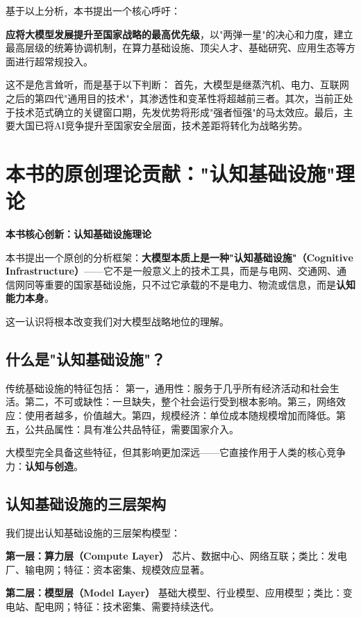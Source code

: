 基于以上分析，本书提出一个核心呼吁：

\textbf{应将大模型发展提升至国家战略的最高优先级}，以"两弹一星"的决心和力度，建立最高层级的统筹协调机制，在算力基础设施、顶尖人才、基础研究、应用生态等方面进行超常规投入。

这不是危言耸听，而是基于以下判断：
首先，大模型是继蒸汽机、电力、互联网之后的第四代"通用目的技术"，其渗透性和变革性将超越前三者。其次，当前正处于技术范式确立的关键窗口期，先发优势将形成"强者恒强"的马太效应。最后，主要大国已将AI竞争提升至国家安全层面，技术差距将转化为战略劣势。

\section{本书的原创理论贡献："认知基础设施"理论}

\textbf{本书核心创新：认知基础设施理论}

本书提出一个原创的分析框架：\textbf{大模型本质上是一种"认知基础设施"（Cognitive Infrastructure）}——它不是一般意义上的技术工具，而是与电网、交通网、通信网同等重要的国家基础设施，只不过它承载的不是电力、物流或信息，而是\textbf{认知能力本身}。

这一认识将根本改变我们对大模型战略地位的理解。

\subsection{什么是"认知基础设施"？}

传统基础设施的特征包括：
第一，通用性：服务于几乎所有经济活动和社会生活。第二，不可或缺性：一旦缺失，整个社会运行受到根本影响。第三，网络效应：使用者越多，价值越大。第四，规模经济：单位成本随规模增加而降低。第五，公共品属性：具有准公共品特征，需要国家介入。

大模型完全具备这些特征，但其影响更加深远——它直接作用于人类的核心竞争力：\textbf{认知与创造}。

\subsection{认知基础设施的三层架构}

我们提出认知基础设施的三层架构模型：

\textbf{第一层：算力层（Compute Layer）}
芯片、数据中心、网络互联；类比：发电厂、输电网；特征：资本密集、规模效应显著。

\textbf{第二层：模型层（Model Layer）}
基础大模型、行业模型、应用模型；类比：变电站、配电网；特征：技术密集、需要持续迭代。

